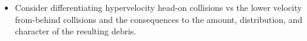 \begin{itemize}

\item Consider differentiating hypervelocity head-on collisions vs the
  lower velocity from-behind collisions and the consequences to the
  amount, distribution, and character of the resulting debris.

\end{itemize}
